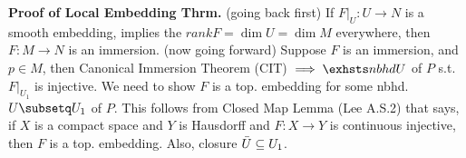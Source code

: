 \documentclass[12pt,letterpaper]{article}
\begin{document}
\textbf{Proof of Local Embedding Thrm.} (going back first) If $F|_U: U \rightarrow N$ is a smooth embedding, implies the $rank F = \dim U = \dim M$ everywhere, then $F: M \rightarrow N$ is an immersion. (now going forward) Suppose $F$ is an immersion, and $p \in M$, then Canonical Immersion Theorem (CIT) $\implies \exhsts nbhd U$ of $P$ s.t. $F|_{U_1}$ is injective. We need to show $F$ is a top. embedding for some nbhd. $U \subsetq U_1$ of $P$. This follows from Closed Map Lemma (Lee A.S.2) that says, if $X$ is a compact space and $Y$ is Hausdorff and $F: X \rightarrow Y$ is continuous injective, then $F$ is a top. embedding. Also, closure $\Bar{U} \subseteq U_1$.
\end{document}
